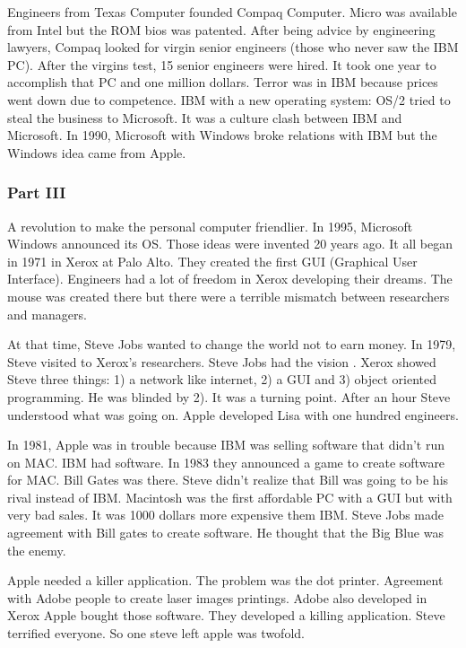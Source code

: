  Engineers from Texas Computer founded Compaq Computer. 
 Micro was available from Intel but the ROM bios was patented.
 After being advice by engineering lawyers, Compaq looked for virgin senior engineers 
 (those who never saw the IBM PC).  After the virgins test, 15 senior engineers were hired. 
 It took one year to accomplish that PC and one million dollars. 
 Terror was in IBM because prices went down due to competence.   
 IBM with a new operating system: OS/2 tried to steal the business to Microsoft. 
 It was a culture clash between IBM and Microsoft. 
 In 1990,  Microsoft with Windows broke 
 relations with IBM but the Windows idea came from Apple.   
   
  
 \subsubsection*{Part III} 
 A revolution to make the personal computer friendlier.  
 In 1995,  Microsoft Windows announced its OS. 
 Those ideas were invented 20 years ago. 
 It all began in 1971 in  Xerox at Palo Alto. 
 They created the first GUI (Graphical User Interface).
 Engineers had a lot of freedom in Xerox developing  their dreams. The mouse was 
 created there but there were a terrible mismatch between researchers and managers. 
 
 At that time, Steve Jobs wanted to change the world not to earn money.
 In 1979, Steve  visited to Xerox's researchers. 
 Steve Jobs had the vision . Xerox showed Steve three things: 1) a network like internet, 
 2) a GUI and  3) object oriented programming. He 
 was blinded by 2). It was a turning point. 
 After an hour Steve understood what was going on. 
 Apple developed Lisa with one hundred engineers. 
   
 In 1981, Apple was in trouble because IBM was selling software that didn't run on MAC. 
 IBM had software. In 1983 they announced a game to 
 create software for MAC. Bill Gates was there. 
 Steve didn't realize that Bill was going to be his rival instead of IBM. 
 Macintosh was the first 
 affordable PC with a GUI but with  very bad sales. 
 It was 1000 dollars more expensive them IBM.  
 Steve Jobs made agreement with Bill gates to create software. 
 He thought that the Big Blue was the enemy. 
   
   
 Apple needed a killer application. 
 The problem was the dot printer. Agreement with Adobe people to create laser images printings. 
 Adobe also developed in Xerox 
 Apple bought those software.
 They developed a killing application. 
 Steve terrified everyone. 
 So one steve left apple was twofold. 
   
